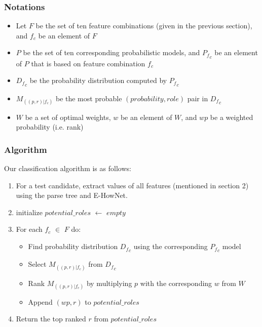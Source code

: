 \documentclass[11pt]{article}
\begin{document}
\subsubsection*{Notations}
\begin{itemize}
\item Let $F$ be the set of ten feature combinations (given in the previous section), and $f_c$ be an element of $F$
\item $P$ be the set of ten corresponding probabilistic models, and ${P_f}_c$ be an element of $P$ that is based on feature combination $f_c$ 
\item ${D_f}_c$ be the probability distribution computed by ${P_f}_c$ 
\item $M_{((p,r)|f_c)}$ be the most probable $(probability,role)$ pair in  ${D_f}_c$
\item $W$ be a set of optimal weights, $w$ be an element of $W$, and $wp$ be a weighted probability (i.e. rank)
\end{itemize} 
\subsubsection*{Algorithm}
Our classification algorithm is as follows:
\begin{enumerate}
\item For a test candidate, extract values of all features (mentioned in section 2) using the parse tree and E-HowNet.
\item initialize $potential\_roles$  $\leftarrow$ $empty$ 
\item For each $f_c$  $\in$ $F$ do:
\begin{itemize}
 \item Find probability distribution ${D_f}_c$ using the corresponding ${P_f}_c$ model
 \item Select $M_{((p,r)|f_c)}$ from ${D_f}_c$
 \item Rank $M_{((p,r)|f_c)}$ by multiplying $p$ with the corresponding $w$ from $W$
 \item Append $(wp,r)$ to $potential\_roles$
 \end{itemize}
\item Return the top ranked $r$ from $potential\_roles$
 \end{enumerate}
\end{document}
